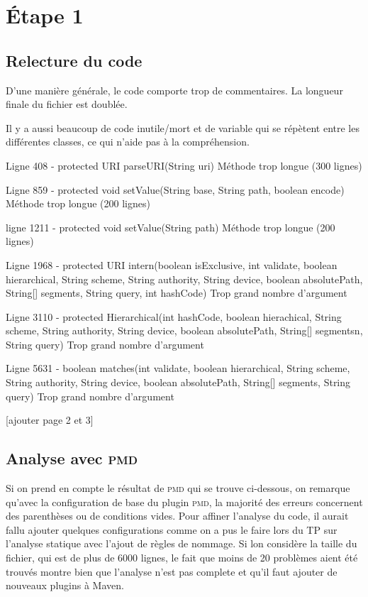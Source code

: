 \section{\'Etape 1}
	\subsection{Relecture du code}
		D'une manière générale, le code comporte trop de commentaires. La longueur finale du fichier est doublée.
		
		Il y a aussi beaucoup de code inutile/mort et de variable qui se répètent entre les différentes classes, ce qui n'aide pas à la compréhension.

		Ligne 408 - protected URI parseURI(String uri)
		Méthode trop longue (300 lignes)

		Ligne 859 - protected void setValue(String base, String path, boolean encode)
		Méthode trop longue (200 lignes)

		ligne 1211 - protected void setValue(String path)
		Méthode trop longue (200 lignes)

		Ligne 1968 - protected URI intern(boolean isExclusive, int validate, boolean hierarchical, String scheme, String authority, String device, boolean absolutePath, String[] segments, String query, int hashCode)
		Trop grand nombre d'argument

		Ligne 3110 - protected Hierarchical(int hashCode, boolean hierachical, String scheme, String authority, String device, boolean absolutePath, String[] segmentsn, String query)
		Trop grand nombre d'argument

		Ligne 5631 - boolean matches(int validate, boolean hierarchical, String scheme, String authority, String device, boolean absolutePath, String[] segments, String query)
		Trop grand nombre d'argument

		[ajouter page 2 et 3]



		
	\subsection{Analyse avec \textsc{pmd}}
		Si on prend en compte le résultat de \textsc{pmd} qui se trouve ci-dessous, on remarque qu'avec la configuration de base du plugin \textsc{pmd}, la majorité des erreurs concernent des parenthèses ou de conditions vides. Pour affiner l'analyse du code, il aurait fallu ajouter quelques configurations comme on a pus le faire lors du TP sur l'analyse statique avec l'ajout de règles de nommage. Si lon considère la taille du fichier, qui est de plus de 6000 lignes, le fait que moins de 20 problèmes aient été trouvés montre bien que l'analyse n'est pas complete et qu'il faut ajouter de nouveaux plugins à Maven.

